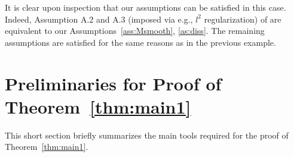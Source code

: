 \documentclass[journal,onecolumn]{IEEEtran}
\begin{document}
{It is clear upon inspection that our assumptions can be satisfied in this case. Indeed, Assumption A.2 and A.3 (imposed via e.g., $l^2$ regularization) of \cite{raginsky2017non} are equivalent to our Assumptions~\ref{ass:Msmooth}, \ref{as:diss}. The remaining assumptions are satisfied for the same reasons as in the previous example. 



\section{Preliminaries for Proof of Theorem~\ref{thm:main1}}
\label{sec:proofprelim}
This short section briefly summarizes the main tools required for the proof of Theorem~\ref{thm:main1}. 

}
\end{document}
